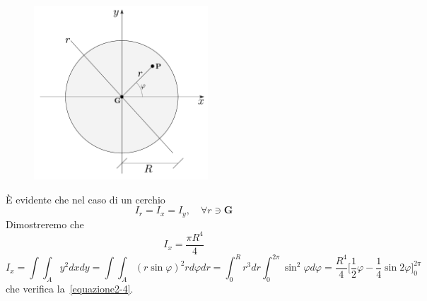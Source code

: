 \renewcommand{\thefigure}{2~-~2}
\begin{figure}[ht]
\centering
\includegraphics[width=0.58\textwidth]{Immagini/Parte_2/Figura2_2/Figura2_2.pdf}
\caption{}
\label{figura2-2}
\end{figure}
È evidente che nel caso di un cerchio
\begin{equation*}
I_r = I_x = I_y, \quad \forall r \owns \mathbf{G}
\end{equation*}
Dimostreremo che 
\begin{equation} \label{equazione2-4}
\boxed{I_x = \frac{\pi R^4}{4}}
\tag{2.4}
\end{equation}
\begin{equation*}
I_x = \int\int_A y^{2}dxdy = \int\int_A (r\sin\varphi)^{2}rd\varphi dr = \int_{0}^{R}r^{3}dr\int_{0}^{2\pi}\sin^{2}\varphi d\varphi = \frac{R^4}{4}\biggl[\frac{1}{2}\varphi-\frac{1}{4}\sin 2\varphi \biggr]_{0}^{2\pi}
\end{equation*}
che verifica la~\eqref{equazione2-4}.
\renewcommand{\thefigure}{2~-~3}

